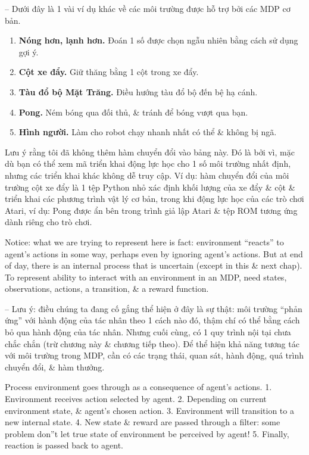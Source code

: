 \documentclass{article}
\begin{document}
\begin{itemize}
\begin{itemize}
\begin{itemize}
            -- Dưới đây là 1 vài ví dụ khác về các môi trường được hỗ trợ bởi các MDP cơ bản.
            \begin{enumerate}
                \item {\bf Nóng hơn, lạnh hơn.} Đoán 1 số được chọn ngẫu nhiên bằng cách sử dụng gợi ý.
                \item {\bf Cột xe đẩy.} Giữ thăng bằng 1 cột trong xe đẩy.
                \item {\bf Tàu đổ bộ Mặt Trăng.} Điều hướng tàu đổ bộ đến bệ hạ cánh.
                \item {\bf Pong.} Ném bóng qua đối thủ, \& tránh để bóng vượt qua bạn.
                \item {\bf Hình người.} Làm cho robot chạy nhanh nhất có thể \& không bị ngã.
            \end{enumerate}
            Lưu ý rằng tôi đã không thêm hàm chuyển đổi vào bảng này. Đó là bởi vì, mặc dù bạn có thể xem mã triển khai động lực học cho 1 số môi trường nhất định, nhưng các triển khai khác không dễ truy cập. Ví dụ: hàm chuyển đổi của môi trường cột xe đẩy là 1 tệp Python nhỏ xác định khối lượng của xe đẩy \& cột \& triển khai các phương trình vật lý cơ bản, trong khi động lực học của các trò chơi Atari, ví dụ: Pong được ẩn bên trong trình giả lập Atari \& tệp ROM tương ứng dành riêng cho trò chơi.

            Notice: what we are trying to represent here is fact: environment ``reacts'' to agent's actions in some way, perhaps even by ignoring agent's actions. But at end of day, there is an internal process that is uncertain (except in this \& next chap). To represent ability to interact with an environment in an MDP, need states, observations, actions, a transition, \& a reward function.

            -- Lưu ý: điều chúng ta đang cố gắng thể hiện ở đây là sự thật: môi trường ``phản ứng'' với hành động của tác nhân theo 1 cách nào đó, thậm chí có thể bằng cách bỏ qua hành động của tác nhân. Nhưng cuối cùng, có 1 quy trình nội tại chưa chắc chắn (trừ chương này \& chương tiếp theo). Để thể hiện khả năng tương tác với môi trường trong MDP, cần có các trạng thái, quan sát, hành động, quá trình chuyển đổi, \& hàm thưởng.

            {\sf Process environment goes through as a consequence of agent's actions.} 1. Environment receives action selected by agent. 2. Depending on current environment state, \& agent's chosen action. 3. Environment will transition to a new internal state. 4. New state \& reward are passed through a filter: some problem don''t let true state of environment be perceived by agent! 5. Finally, reaction is passed back to agent.


\end{itemize}
\end{itemize}
\end{itemize}
\end{document}
